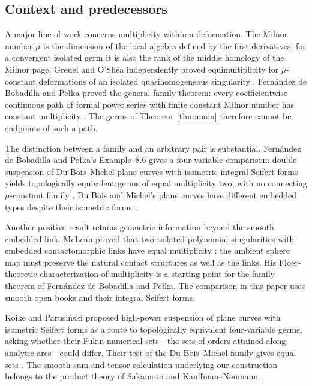\subsection*{Context and predecessors}

A major line of work concerns multiplicity within a deformation.
The Milnor number \(\mu\) is the dimension of the local algebra
defined by the first derivatives; for a convergent isolated germ it
is also the rank of the middle homology of the Milnor page.
Greuel and O'Shea independently proved equimultiplicity for
\(\mu\)-constant deformations of an isolated quasihomogeneous
singularity \cite{Greuel1986,OShea1987}.
Fernández de Bobadilla and Pełka proved the general family theorem:
every coefficientwise continuous path of formal power series with
finite constant Milnor number has constant multiplicity
\cite[Theorem~1.1]{BobadillaPelka2024}. The germs of
Theorem~\ref{thm:main} therefore cannot be endpoints of such a path.

The distinction between a family and an arbitrary pair is substantial.
Fernández de Bobadilla and Pełka's Example~8.6 gives a four-variable comparison:
double suspension of Du Bois--Michel plane curves with isometric
integral Seifert forms yields topologically equivalent germs of
equal multiplicity two, with no connecting \(\mu\)-constant family
\cite[Example~8.6]{BobadillaPelka2024}. Du Bois and Michel's plane
curves have different embedded types despite their isometric forms
\cite{DuBoisMichel1994}.

Another positive result retains geometric information beyond the
smooth embedded link. McLean proved that two isolated polynomial
singularities with embedded contactomorphic links have equal
multiplicity \cite[Theorem~1.1]{McLean2019}: the ambient sphere
map must preserve the natural contact structures as well as the
links. His Floer-theoretic characterization of multiplicity is a
starting point for the family theorem of Fernández de Bobadilla
and Pełka. The comparison in this paper uses smooth open books and
their integral Seifert forms.

Koike and Parusiński proposed high-power suspension of plane curves
with isometric Seifert forms as a route to topologically equivalent
four-variable germs, asking whether their Fukui numerical sets---the
sets of orders attained along analytic arcs---could differ. Their test of the Du Bois--Michel family gives
equal sets \cite[Section~5, pp.~294--296]{KoikeParusinski2010}. The
smooth sum and tensor calculation underlying our construction belongs
to the product theory of Sakamoto and Kauffman--Neumann
\cite{Sakamoto1974,KauffmanNeumann1977}.

